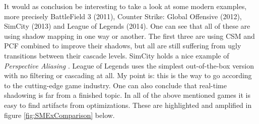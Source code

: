 \newpage
It would as conclusion be interesting to take a look at some modern examples, more precisely BattleField 3 (2011), Counter Strike: Global Offensive (2012), SimCity (2013) and League of Legends (2014). One can see that all of these are using shadow mapping in one way or another. The first three are using CSM and PCF combined to improve their shadows, but all are still suffering from ugly transitions between their cascade levels. SimCity holds a nice example of \textit{Perspective Aliasing} \cite{ImprovedShadowMapping}. League of Legends uses the simplest out-of-the-box version with no filtering or cascading at all. My point is: this is the way to go according to the cutting-edge game industry. One can also conclude that real-time shadowing is far from a finished topic. In all of the above mentioned games it is easy to find artifacts from optimizations. These are highlighted and amplified in figure \ref{fig:SMExComparison} below.

